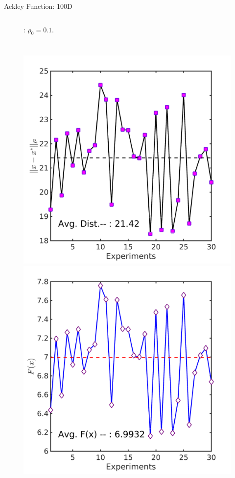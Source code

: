 \documentclass{beamer}
\begin{document}
\begin{frame}{Ackley Function: 100D}
\begin{columns}[c]
\begin{figure}[!htbp]
	  \vspace{-0.2cm}
	  \footnotesize{ \caption{: $\rho_0=0.1$.} }
\end{figure}
\end{columns}
\vspace{-0.6cm}
\begin{columns}[c]
	\column{6cm}
\begin{figure}[!htbp]
	\centering
	  \includegraphics[scale=0.1]{./figures/ackley100Drandr0_5_dist.png}
	  \includegraphics[scale=0.1]{./figures/ackley100Drandr0_5_val.png}

\end{figure}
\end{columns}
\end{frame}
\end{document}
